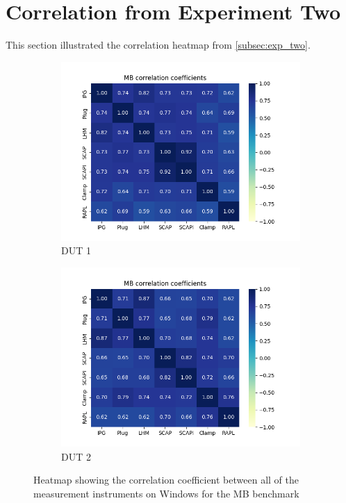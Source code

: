 \section{Correlation from Experiment Two}\label{app:cor_exp_two}

This section illustrated the correlation heatmap from \cref{subsec:exp_two}.

\begin{figure}[H]
    \centering
    \begin{subfigure}[b]{0.49\textwidth}
        \centering
        \includegraphics[width=\textwidth]{figures/MandelbrotDut1.png}
        \caption{DUT 1}
    \end{subfigure}
    \hfill
    \begin{subfigure}[b]{0.49\textwidth}
        \centering
        \includegraphics[width=\textwidth]{figures/MandelbrotDut2.png}
        \caption{DUT 2}
    \end{subfigure}
    \caption{Heatmap showing the correlation coefficient between all of the measurement instruments on Windows for the MB benchmark}
\end{figure}

